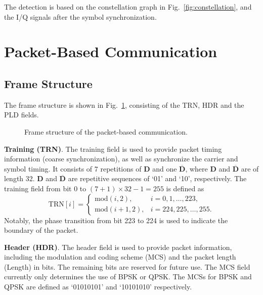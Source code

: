 \documentclass[journal,twoside]{IEEEtran}
\begin{document}
      The detection is based on the constellation graph in Fig.~\ref{fig:constellation}, and the I/Q signals after the symbol synchronization.

  \section{Packet-Based Communication}

    \subsection{Frame Structure}\label{subsec:frame_structure}

      The frame structure is shown in Fig.~\ref{fig:frame_structure},
      consisting of the TRN, HDR and the PLD fields.
      \begin{figure}[htbp]
        \centering
        
        \caption{Frame structure of the packet-based communication.}
        \label{fig:frame_structure}
      \end{figure}

    \textbf{Training (TRN)}.
    The training field is used to provide packet timing information (coarse synchronization),
    as well as synchronize the carrier and symbol timing.
    It consists of 7 repetitions of $\mathbf{D}$ and one $\overline{\mathbf{D}}$,
    where $\mathbf{D}$ and $\overline{\mathbf{D}}$ are of length 32.
    $\mathbf{D}$ and $\overline{\mathbf{D}}$ are repetitive sequences of `01' and `10', respectively.
    The training field from bit $0$ to $(7+1)\times32-1=255$ is defined as
    \begin{equation}
      \mathrm{TRN}[i]=\begin{cases}
        \mathrm{mod}(i,2), & i=0,1,\dots,223,\\
        \mathrm{mod}(i+1,2), & i=224,225,\dots,255.
      \end{cases}
    \end{equation}
    Notably, the phase transition from bit 223 to 224 is used to indicate the boundary of the packet.

    \textbf{Header (HDR)}.
    The header field is used to provide packet information,
    including the modulation and coding scheme (MCS) and the packet length (Length) in bits.
    The remaining bits are reserved for future use.
    The MCS field currently only determines the use of BPSK or QPSK.
    The MCSs for BPSK and QPSK are defined as `01010101' and `10101010' respectively.
\end{document}

